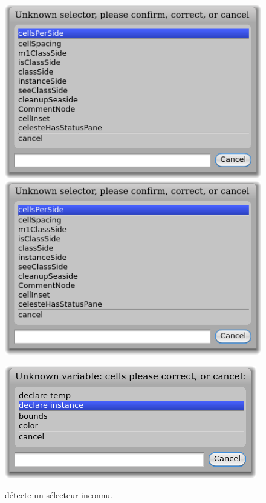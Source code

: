 \documentclass[a4paper,10pt,twoside]{book}
\begin{document}
\begin{figure}[htb]
\begin{minipage}{0.34\textwidth}
	\centering
	\ifluluelse
		{\includegraphics[width=\textwidth]{UnknownSelector}}
		{\includegraphics[scale=0.7]{UnknownSelector}}
	\caption{\pharo détecte un sélecteur inconnu.\label{fig:unknownSelector}}
\end{minipage}
\hfill
\begin{minipage}{0.64\textwidth}
	\centering
	\ifluluelse
		{\includegraphics[width=\textwidth]{DeclareInstanceVar}}

\end{minipage}
\end{figure}
\end{document}

